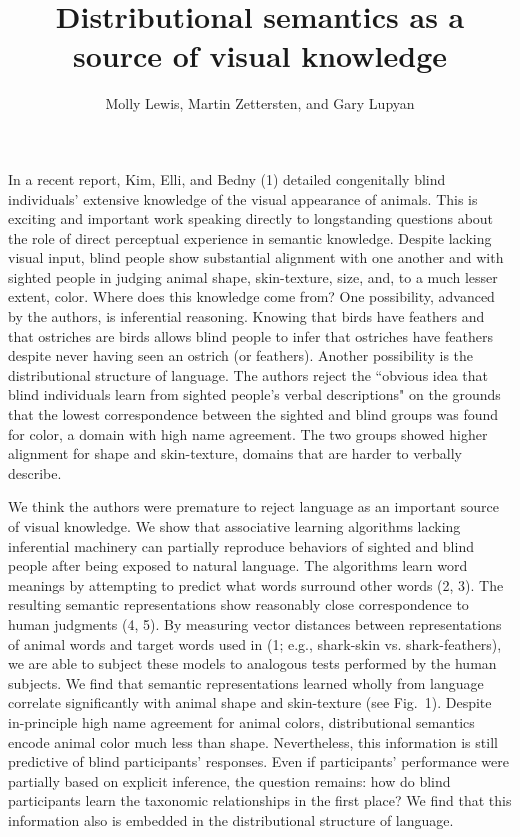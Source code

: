 \documentclass[12pt]{article}
\begin{document}
\title{\normalsize \vspace{-.5\baselineskip} \bf{Distributional semantics as a source of visual knowledge} \vspace{-1.2\baselineskip}}
\author{\small  Molly Lewis, Martin Zettersten, and Gary Lupyan}
\date{}
\clearpage\maketitle
\thispagestyle{empty}
  \small
  
 \vspace{-1\baselineskip}
 
In a recent report, Kim, Elli, and Bedny (1) detailed congenitally blind individuals’ extensive knowledge of the visual appearance of animals. This is exciting and important work speaking directly to longstanding questions about the role of direct perceptual experience in semantic knowledge. Despite lacking visual input, blind people show substantial alignment with one another and with sighted people in judging animal shape, skin-texture, size, and, to a much lesser extent, color. Where does this knowledge come from? One possibility, advanced by the authors, is inferential reasoning. Knowing that birds have feathers and that ostriches are birds allows blind people to infer that ostriches have feathers despite never having seen an ostrich (or feathers). Another possibility is the distributional structure of language. The authors reject the ``obvious idea that blind individuals learn from sighted people's verbal descriptions" on the grounds that the lowest correspondence between the sighted and blind groups was found for color, a domain with high name agreement. The two groups showed higher alignment for shape and skin-texture, domains that are harder to verbally describe. 

We think the authors were premature to reject language as an important source of visual knowledge. We show that associative learning algorithms lacking inferential machinery can partially reproduce behaviors of sighted and blind people after being exposed to natural language. The algorithms learn word meanings by attempting to predict what words surround other words (2, 3). The resulting semantic representations show reasonably close correspondence to human judgments  (4, 5). By measuring vector distances between representations of animal words and target words used in (1; e.g., shark-skin vs. shark-feathers), we are able to subject these models to analogous tests performed by the human subjects. We find that semantic representations learned wholly from language correlate significantly with animal shape and skin-texture (see Fig.\ 1). Despite in-principle high name agreement for animal colors, distributional semantics encode animal color much less than shape. Nevertheless, this information is still predictive of blind participants' responses. Even if participants' performance were partially based on explicit inference, the question remains: how do blind participants learn the taxonomic relationships in the first place? We find that this information  also is embedded in the distributional structure of language. 
\end{document}
